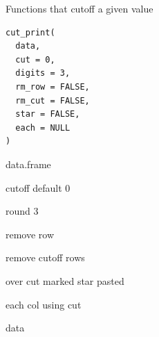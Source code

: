 \documentclass[a4paper]{book}
\begin{document}
%
\begin{Description}
Functions that cutoff a given value
\end{Description}
%
\begin{Usage}
\begin{verbatim}
cut_print(
  data,
  cut = 0,
  digits = 3,
  rm_row = FALSE,
  rm_cut = FALSE,
  star = FALSE,
  each = NULL
)
\end{verbatim}
\end{Usage}
%
\begin{Arguments}
\begin{ldescription}
\item[\code{data}] data.frame

\item[\code{cut}] cutoff  default 0

\item[\code{digits}] round 3

\item[\code{rm\_row}] remove row

\item[\code{rm\_cut}] remove cutoff rows

\item[\code{star}] over cut marked star pasted

\item[\code{each}] each col using cut
\end{ldescription}
\end{Arguments}
%
\begin{Value}
data
\end{Value}
%
\end{document}
